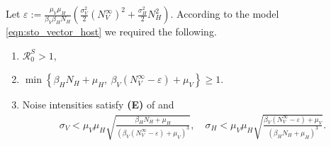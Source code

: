 \begin{assumption} \label{ass:persistence}
    Let
    $
        \displaystyle
        \varepsilon:=
            \frac{\mu_V \mu_H}{\beta_V \beta_H N_H}
                \left(
                    \frac{\sigma_V ^ 2}{2}
                    \left(
                        N_V ^ {\infty}
                    \right) ^ 2
                    +
                    \frac{\sigma_H ^ 2}{2}
                    N_H ^2
                \right)
    $.
    According to the model \eqref{eqn:sto_vector_host} we required the
    following.
    \begin{enumerate}[\bf{(P\textendash}1)]
        \item
            $ \mathcal{R}_0 ^ S > 1$,
             
        \item
        $
            \displaystyle
            \min
            \left\{
                 \beta_H N_H + \mu_H, \ 
                 \beta_V (N_V ^ {\infty} - \varepsilon) + \mu_V
            \right\}
            \geq 1.
        $
        \item Noise intensities satisfy 
            \textbf{(E)} of 
            and
            \begin{align*}
                \sigma_V 
                    < \mu_V \mu_H
                    \sqrt{
                        \frac{\beta_H N_H + \mu_H}{
                            \left(
                                \beta_V
                                \left(
                                    N_V ^ {\infty} - \varepsilon
                                \right) 
                                + \mu_V
                            \right)  ^ 3
                        }
                    },
                \quad
                \sigma_H 
                    < \mu_V \mu_H
                    \sqrt{
                        \frac{\beta_V (N_V ^ {\infty} - \varepsilon) + \mu_V}{
                            \left(
                                \beta_H N_H + \mu_H
                            \right)  ^ 3
                        }
                    } .
            \end{align*}
    \end{enumerate}
%
\end{assumption}

